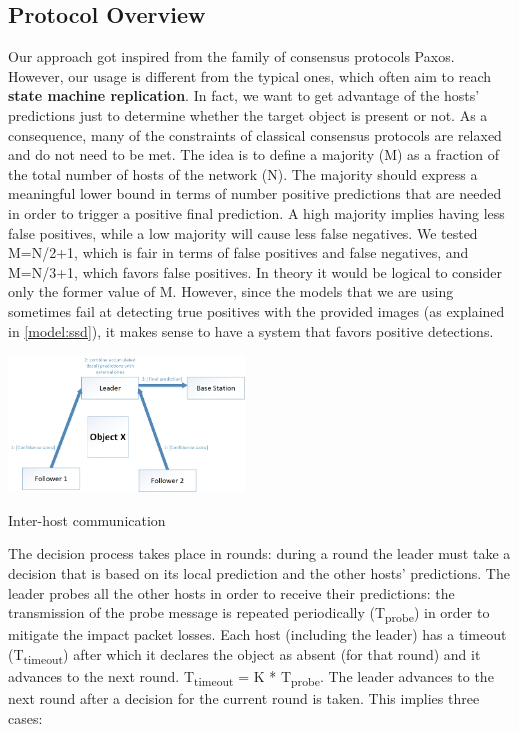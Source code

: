 \documentclass[10pt,conference,compsocconf]{IEEEtran}
\begin{document}
\begin{enumerate}
\subsection{Protocol Overview}
\label{subsec:protooverview}
Our approach got inspired from the family of consensus protocols Paxos. However, our usage is different from the typical ones, which often aim to reach \textbf{state machine replication}. In fact, we want to get advantage of the hosts' predictions just to determine whether the target object is present or not. As a consequence, many of the constraints of classical consensus protocols are relaxed and do not need to be met. The idea is to define a majority (M) as a fraction of the total number of hosts of the network (N). The majority should express a meaningful lower bound in terms of number positive predictions that are needed in order to trigger a positive final prediction. A high majority implies having less false positives, while a low majority will cause less false negatives. We tested M=N/2+1, which is fair in terms of false positives and false negatives, and M=N/3+1, which favors false positives. In theory it would be logical to consider only the former value of M. However, since the models that we are using sometimes fail at detecting true positives with the provided images (as explained in \ref{model:ssd}), it makes sense to have a system that favors positive detections.
\begin{center}
	\captionsetup{type=figure}
	\includegraphics[width=0.47\textwidth]{img/protocol_sketch_inter_host.jpg}
	\caption {Inter-host communication}
	\label{fig:inter_host}
\end{center}
The decision process takes place in rounds: during a round the leader must take a decision that is based on its local prediction and the other hosts' predictions. The leader probes all the other hosts in order to receive their predictions: the transmission of the probe message is repeated periodically (T\textsubscript{probe}) in order to mitigate the impact packet losses. Each host (including the leader) has a timeout (T\textsubscript{timeout}) after which it declares the object as absent (for that round) and it advances to the next round. T\textsubscript{timeout} = K * T\textsubscript{probe}. The leader advances to the next round after a decision for the current round is taken. This implies three cases:

\end{enumerate}
\end{document}
